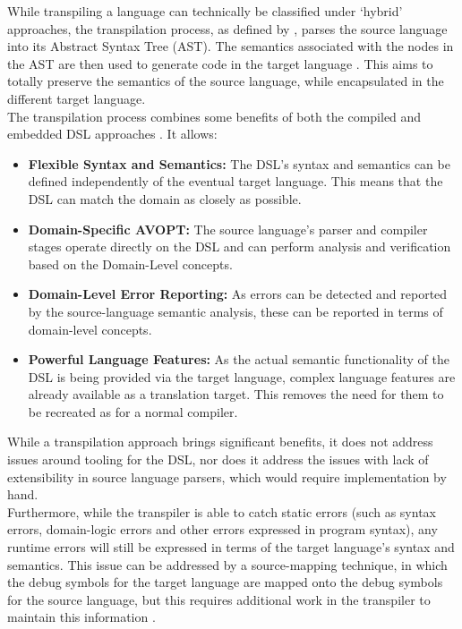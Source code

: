 While transpiling a language can technically be classified under `hybrid' approaches, the transpilation process, as defined by \citet{Mernik:2005:DDL:1118890.1118892}, parses the source language into its Abstract Syntax Tree (AST).
The semantics associated with the nodes in the AST are then used to generate code in the target language \citep[pg. 4]{Bouraqadi:2016:MPT:2991041.2991051}.
This aims to totally preserve the semantics of the source language, while encapsulated in the different target language. \\

The transpilation process combines some benefits of both the compiled and embedded DSL approaches \citep{kulkarnitranspiler}.
It allows:
\begin{itemize}
    \item \textbf{Flexible Syntax and Semantics:} The DSL's syntax and semantics can be defined independently of the eventual target language. 
    This means that the DSL can match the domain as closely as possible. 
    \item \textbf{Domain-Specific AVOPT:} The source language's parser and compiler stages operate directly on the DSL and can perform analysis and verification based on the Domain-Level concepts. 
    \item \textbf{Domain-Level Error Reporting:} As errors can be detected and reported by the source-language semantic analysis, these can be reported in terms of domain-level concepts. 
    \item \textbf{Powerful Language Features:} As the actual semantic functionality of the DSL is being provided via the target language, complex language features are already available as a translation target.
    This removes the need for them to be recreated as for a normal compiler. 
\end{itemize}

While a transpilation approach brings significant benefits, it does not address issues around tooling for the DSL, nor does it address the issues with lack of extensibility in source language parsers, which would require implementation by hand. \\

Furthermore, while the transpiler is able to catch static errors (such as syntax errors, domain-logic errors and other errors expressed in program syntax), any runtime errors will still be expressed in terms of the target language's syntax and semantics. 
This issue can be addressed by a source-mapping technique, in which the debug symbols for the target language are mapped onto the debug symbols for the source language, but this requires additional work in the transpiler to maintain this information \citep{kulkarnitranspiler}.


